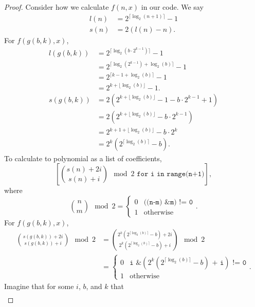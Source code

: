 \documentclass{article}
\begin{document}
	\begin{proof}
		Consider how we calculate $f(n,x)$ in our code.
		We say
		\begin{align*}
			l(n) &= 2^{\lceil \log_2{(n+1)} \rceil} - 1 \\
			s(n) &= 2(l(n) - n).
		\end{align*}
		For $f(g(b,k),x)$,
		\begin{align*}
			l(g(b,k)) &= 2^{\lceil \log_2{\left(b\cdot2^{k-1}\right)} \rceil} - 1 \\
			&= 2^{\lceil \log_2{\left(2^{k-1}\right)}+ \log_2{(b)} \rceil} - 1 \\
			&= 2^{\lceil k-1 + \log_2{(b)} \rceil} - 1 \\
			&= 2^{k + \lfloor \log_2{(b)} \rfloor} - 1. \\
			s(g(b,k)) &= 2\left(2^{k+\lfloor\log_2{(b)}\rfloor} - 1 - b\cdot2^{k-1} + 1\right) \\
			&= 2\left(2^{k + \lfloor \log_2{(b)} \rfloor} - b\cdot2^{k-1}\right) \\
			&= 2^{k+1+\lfloor\log_2{(b)}\rfloor} - b\cdot2^{k} \\
			&= 2^{k}\left(2^{\lceil \log_2{(b)}\rceil} - b\right).
		\end{align*}
		To calculate to polynomial as a list of coefficients,
		\begin{equation*}
			\left[\binom{s(n) + 2i}{s(n) + i} \mod 2 \texttt{ for i in range(n+1)} \right],
		\end{equation*}
		where
		\begin{equation*}
			\binom{n}{m} \mod 2 = \begin{cases}
				0 & \texttt{((n-m) \& m) != 0} \\
				1 & \text{otherwise}
			\end{cases}.
		\end{equation*}
		For $f(g(b,k),x)$,
		\begin{align*}
			\binom{s(g(b,k))+2i}{s(g(b,k))+i} \mod 2 &= \binom{2^{k}\left(2^{\lceil \log_2{(b)}\rceil} - b\right) + 2i}{2^{k}\left(2^{\lceil \log_2{(b)}\rceil} - b\right) + i} \mod 2 \\
			&= \begin{cases}
				0 & \texttt{i \& }\left(2^{k}\left(2^{\lceil \log_2{(b)}\rceil} - b\right) \texttt{ + i}\right)\texttt{ != 0} \\
				1 & \text{otherwise}
			\end{cases}.
		\end{align*}
		Imagine that for some $i$, $b$, and $k$ that
		\begin{align*}

\end{align*}
\end{proof}
\end{document}
